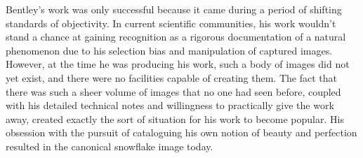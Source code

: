 Bentley's work was only successful because it came during a period of shifting
standards of objectivity. In current scientific communities, his work wouldn't
stand a chance at gaining recognition as a rigorous documentation of a natural
phenomenon due to his selection bias and manipulation of captured images.
However, at the time he was producing his work, such a body of images did not
yet exist, and there were no facilities capable of creating them. The fact that
there was such a sheer volume of images that no one had seen before, coupled
with his detailed technical notes and willingness to practically give the work
away, created exactly the sort of situation for his work to become popular. His
obsession with the pursuit of cataloguing his own notion of beauty and
perfection resulted in the canonical snowflake image today.
